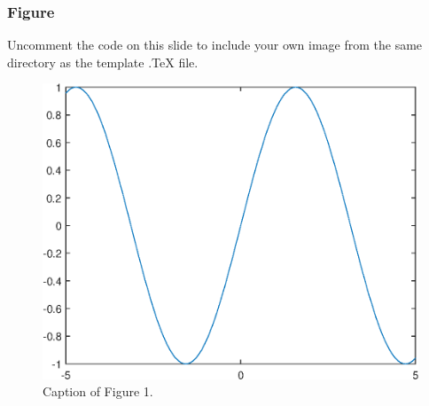 \documentclass[11pt]{beamer}
\numberwithin{thm}{section}
\numberwithin{defn}{section}
\numberwithin{lmm}{section}
\theoremstyle{example}
\numberwithin{figure}{section}
\numberwithin{table}{section}
\numberwithin{equation}{section}
\begin{document}
\begin{frame}
\frametitle{Figure}

Uncomment the code on this slide to include your own image from the same directory as the template .TeX file.
\begin{figure}[htp!]
\centering
\includegraphics[width=0.5\linewidth]{image1}
\caption{Caption of Figure 1.} \label{fig:A}
\end{figure}
\end{frame}

\end{document}
